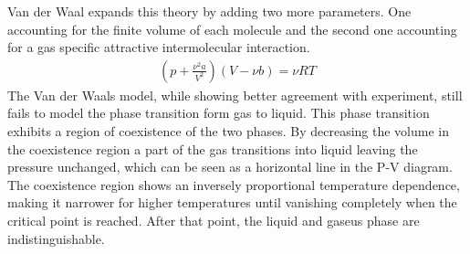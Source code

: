 \documentclass[a4paper,10pt,twocolumn]{article}
\begin{document}
    Van der Waal expands this theory by adding two more parameters.
    One accounting for the finite volume of each molecule and the second one accounting for a gas specific attractive intermolecular interaction.
    \begin{align}
    (p+\frac{\nu^2 a}{V^2})(V-\nu b) = \nu RT
    \end{align}
    The Van der Waals model, while showing better agreement with experiment, still fails to model the phase transition form gas to liquid.
    This phase transition exhibits a region of coexistence of the two phases. 
    By decreasing the volume in the coexistence region a part of the gas transitions into liquid leaving the pressure unchanged, which can be seen as a horizontal line in the P-V diagram.
    The coexistence region shows an inversely proportional temperature dependence, making it narrower for higher temperatures until vanishing completely when the critical point is reached.
    After that point, the liquid and gaseus phase are indistinguishable.
\end{document}
